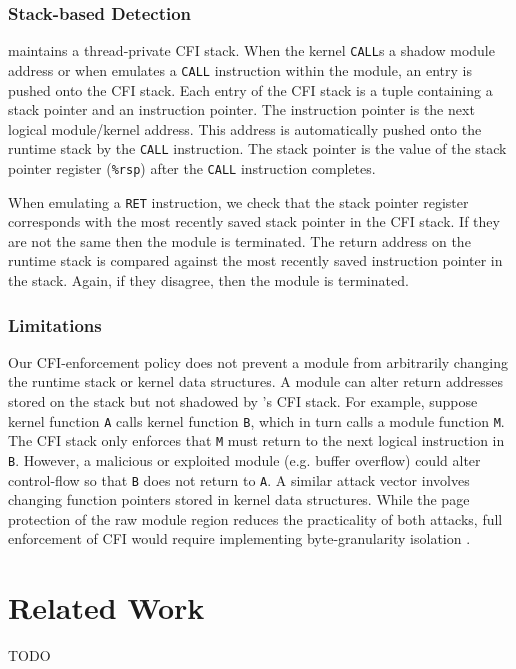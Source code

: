 \documentclass[10pt,preprint]{sigplanconf}
\begin{document}
\subsubsection{Stack-based Detection}
{\Sysname} maintains a thread-private CFI stack. When the kernel \texttt{CALL}s a shadow module address or when {\sysname} emulates a \texttt{CALL} instruction within the module, an entry is pushed onto the CFI stack. Each entry of the CFI stack is a tuple containing a stack pointer and an instruction pointer. The instruction pointer is the next logical module/kernel address. This address is automatically pushed onto the runtime stack by the \texttt{CALL} instruction. The stack pointer is the value of the stack pointer register (\texttt{\%rsp}) after the \texttt{CALL} instruction completes.

When emulating a \texttt{RET} instruction, we check that the stack pointer register corresponds with the most recently saved stack pointer in the CFI stack. If they are not the same then the module is terminated. The return address on the runtime stack is compared against the most recently saved instruction pointer in the stack. Again, if they disagree, then the module is terminated.

\subsubsection{Limitations}
Our CFI-enforcement policy does not prevent a module from arbitrarily changing the runtime stack or kernel data structures. A module can alter return addresses stored on the stack but not shadowed by {\sysname}'s CFI stack. For example, suppose kernel function \texttt{A} calls kernel function \texttt{B}, which in turn calls a module function \texttt{M}. The CFI stack only enforces that \texttt{M} must return to the next logical instruction in \texttt{B}. However, a malicious or exploited module (e.g. buffer overflow) could  alter control-flow so that \texttt{B} does not return to \texttt{A}. A similar attack vector involves changing function pointers stored in kernel data structures. While the page protection of the raw module region reduces the practicality of both attacks, full enforcement of CFI would require implementing byte-granularity isolation \cite{Castro2009,YMao2011}.


\section{Related Work}
TODO
\end{document}
